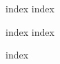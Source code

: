 \documentclass{LFD}
\begin{document}
\topshit

{index}
{index}

{index}
{index}


\ifINSTRUCTORLED
   {index}
\fi
\end{document}
